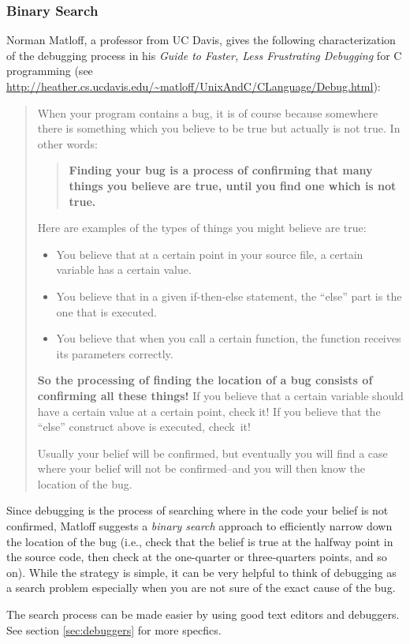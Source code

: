 \documentclass[12pt]{article}
\begin{document}
\subsubsection{Binary Search}
Norman Matloff, a professor from UC Davis, gives the following characterization of the debugging process in his \emph{Guide to Faster, Less Frustrating Debugging} for C programming (see \url{http://heather.cs.ucdavis.edu/~matloff/UnixAndC/CLanguage/Debug.html}):
\begin{quote}
When your program contains a bug, it is of course because somewhere there is something which you believe to be true but actually is not true. In other words:
\begin{quote} \textbf{Finding your bug is a process of confirming that many things you believe are true, until you find one which is not true.} \end{quote}
Here are examples of the types of things you might believe are true:
\begin{itemize}
    \item You believe that at a certain point in your source file, a certain variable has a certain value.
    \item You believe that in a given if-then-else statement, the ``else'' part is the one that is executed.
    \item You believe that when you call a certain function, the function receives its parameters correctly.
\end{itemize}
\textbf{So the processing of finding the location of a bug consists of confirming all these things!} If you believe that a certain variable should have a certain value at a certain point, check it! If you believe that the ``else'' construct above is executed, check~it!

Usually your belief will be confirmed, but eventually you will find a case where your belief will not be confirmed--and you will then know the location of the bug.
\end{quote}
Since debugging is the process of searching where in the code your belief is not confirmed, Matloff suggests a \emph{binary search} approach to efficiently narrow down the location of the bug (i.e., check that the belief is true at the halfway point in the source code, then check at the one-quarter or three-quarters points, and so on).  While the strategy is simple, it can be very helpful to think of debugging as a search problem especially when you are not sure of the exact cause of the bug.

The search process can be made easier by using good text editors and debuggers. See section \ref{sec:debuggers} for more specfics.
\end{document}
